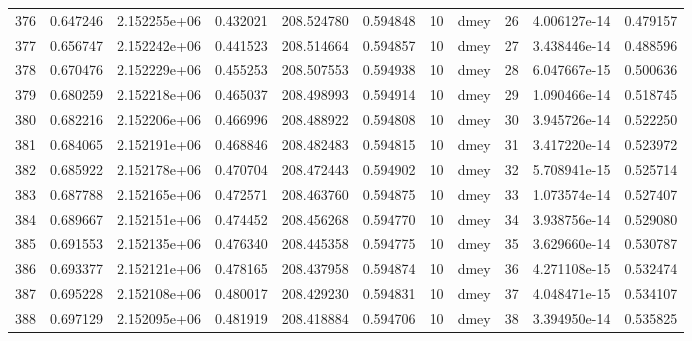 \begin{tabular}{lrrrrrrlrrr}
376  &    0.647246 &        2.152255e+06 &  0.432021 &              208.524780 &    0.594848 &      10 &         dmey &     26 &   4.006127e-14 &      0.479157 \\
377  &    0.656747 &        2.152242e+06 &  0.441523 &              208.514664 &    0.594857 &      10 &         dmey &     27 &   3.438446e-14 &      0.488596 \\
378  &    0.670476 &        2.152229e+06 &  0.455253 &              208.507553 &    0.594938 &      10 &         dmey &     28 &   6.047667e-15 &      0.500636 \\
379  &    0.680259 &        2.152218e+06 &  0.465037 &              208.498993 &    0.594914 &      10 &         dmey &     29 &   1.090466e-14 &      0.518745 \\
380  &    0.682216 &        2.152206e+06 &  0.466996 &              208.488922 &    0.594808 &      10 &         dmey &     30 &   3.945726e-14 &      0.522250 \\
381  &    0.684065 &        2.152191e+06 &  0.468846 &              208.482483 &    0.594815 &      10 &         dmey &     31 &   3.417220e-14 &      0.523972 \\
382  &    0.685922 &        2.152178e+06 &  0.470704 &              208.472443 &    0.594902 &      10 &         dmey &     32 &   5.708941e-15 &      0.525714 \\
383  &    0.687788 &        2.152165e+06 &  0.472571 &              208.463760 &    0.594875 &      10 &         dmey &     33 &   1.073574e-14 &      0.527407 \\
384  &    0.689667 &        2.152151e+06 &  0.474452 &              208.456268 &    0.594770 &      10 &         dmey &     34 &   3.938756e-14 &      0.529080 \\
385  &    0.691553 &        2.152135e+06 &  0.476340 &              208.445358 &    0.594775 &      10 &         dmey &     35 &   3.629660e-14 &      0.530787 \\
386  &    0.693377 &        2.152121e+06 &  0.478165 &              208.437958 &    0.594874 &      10 &         dmey &     36 &   4.271108e-15 &      0.532474 \\
387  &    0.695228 &        2.152108e+06 &  0.480017 &              208.429230 &    0.594831 &      10 &         dmey &     37 &   4.048471e-15 &      0.534107 \\
388  &    0.697129 &        2.152095e+06 &  0.481919 &              208.418884 &    0.594706 &      10 &         dmey &     38 &   3.394950e-14 &      0.535825 \\

\end{tabular}
